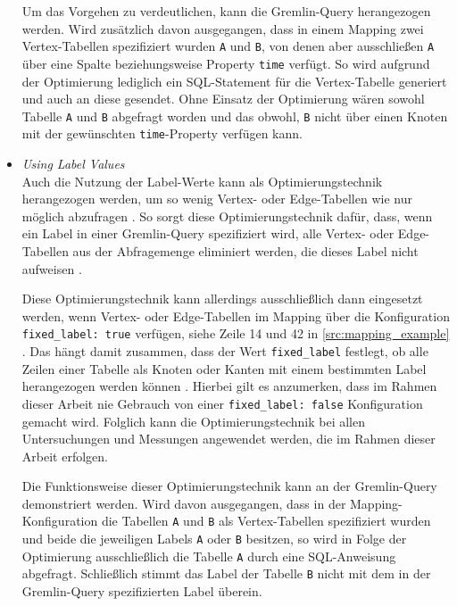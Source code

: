 \begin{itemize}
    Um das Vorgehen zu verdeutlichen, kann die Gremlin-Query  herangezogen werden. Wird zusätzlich davon ausgegangen, dass in einem Mapping zwei Vertex-Tabellen spezifiziert wurden \texttt{A} und \texttt{B}, von denen aber ausschließen \texttt{A} über eine Spalte beziehungsweise Property \texttt{time} verfügt. So wird aufgrund der Optimierung lediglich ein SQL-Statement für die Vertex-Tabelle generiert und auch an diese gesendet. Ohne Einsatz der Optimierung wären sowohl Tabelle \texttt{A} und \texttt{B} abgefragt worden und das obwohl, \texttt{B} nicht über einen Knoten mit der gewünschten \texttt{time}-Property verfügen kann.

    \item \textit{Using Label Values}\\
    Auch die Nutzung der Label-Werte kann als Optimierungstechnik herangezogen werden, um so wenig Vertex- oder Edge-Tabellen wie nur möglich abzufragen \cite{sigmod_tian}. So sorgt diese Optimierungstechnik dafür, dass, wenn ein Label in einer Gremlin-Query spezifiziert wird, alle Vertex- oder Edge-Tabellen aus der Abfragemenge eliminiert werden, die dieses Label nicht aufweisen \cite{sigmod_tian}. 
    
    Diese Optimierungstechnik kann allerdings ausschließlich dann eingesetzt werden, wenn Vertex- oder Edge-Tabellen im Mapping über die Konfiguration \texttt{fixed\_label: true} verfügen, siehe Zeile 14 und 42 in \autoref{src:mapping_example} \cite{sigmod_tian}. Das hängt damit zusammen, dass der Wert \texttt{fixed\_label} festlegt, ob alle Zeilen einer Tabelle als Knoten oder Kanten mit einem bestimmten Label herangezogen werden können \cite{sigmod_tian}. Hierbei gilt es anzumerken, dass im Rahmen dieser Arbeit nie Gebrauch von einer \texttt{fixed\_label: false} Konfiguration gemacht wird. Folglich kann die Optimierungstechnik bei allen Untersuchungen und Messungen angewendet werden, die im Rahmen dieser Arbeit erfolgen. 

    Die Funktionsweise dieser Optimierungstechnik kann an der Gremlin-Query  demonstriert werden. Wird davon ausgegangen, dass in der Mapping-Konfiguration die Tabellen \texttt{A} und \texttt{B} als Vertex-Tabellen spezifiziert wurden und beide die jeweiligen Labels \texttt{A} oder \texttt{B} besitzen, so wird in Folge der Optimierung ausschließlich die Tabelle \texttt{A} durch eine SQL-Anweisung abgefragt. Schließlich stimmt das Label der Tabelle \texttt{B} nicht mit dem in der Gremlin-Query spezifizierten Label überein.


\end{itemize}
